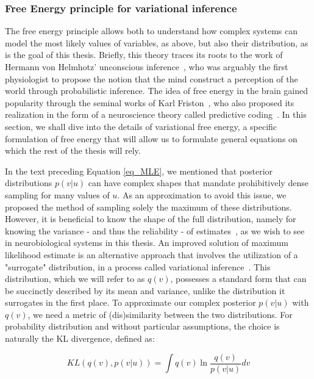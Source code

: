 \subsubsection{Free Energy principle for variational inference}
The free energy principle allows both to understand how complex systems can model the most likely values of variables, as above, but also their distribution, as is the goal of this thesis. Briefly, this theory traces its roots to the work of Hermann von Helmhotz' unconscious inference~\cite{helmholtz1925treatise}, who was arguably the first physiologist to propose the notion that the mind construct a perception of the world through probabilistic inference. The idea of free energy in the brain gained popularity through the seminal works of Karl Friston~\cite{friston2006free, karl2012free, aguilera2022particular}, who also proposed its realization in the form of a neuroscience theory called predictive coding~\cite{friston2005theory, friston2009predictive}. In this section, we shall dive into the details of variational free energy, a specific formulation of free energy that will allow us to formulate general equations on which the rest of the thesis will rely.

In the text preceding Equation \ref{eq_MLE}, we mentioned that posterior distributions $p(v|u)$ can have complex shapes that mandate prohibitively dense sampling for many values of $u$. As an approximation to avoid this issue, we proposed the method of sampling solely the maximum of these distributions. However, it is beneficial to know the shape of the full distribution, namely for knowing the variance - and thus the reliability - of estimates~\cite{mansournia2016inverse}, as we wish to see in neurobiological systems in this thesis. An improved solution of maximum likelihood estimate is an alternative approach that involves the utilization of a "surrogate" distribution, in a process called variational inference~\cite{murphy2012machine}. This distribution, which we will refer to as $q(v)$, possesses a standard form that can be succinctly described by its mean and variance, unlike the distribution it surrogates in the first place.
To approximate our complex posterior $p(v|u)$ with $q(v)$, we need a metric of (dis)similarity between the two distributions. For probability distribution and without particular assumptions, the choice is naturally the \gls{KL} divergence, defined as: 

\begin{equation}
KL(q(v), p(v|u)) = \int{q(v) \ln \frac{q(v)}{p(v|u)} dv}
\end{equation}

